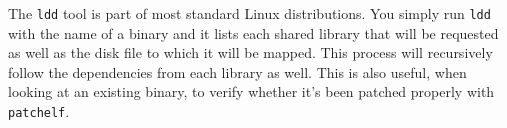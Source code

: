 The \texttt{ldd} tool is part of most standard Linux distributions. You
simply run \texttt{ldd} with the name of a binary and it lists each
shared library that will be requested as well as the disk file to
which it will be mapped. This process will recursively follow the
dependencies from each library as well. This is also useful, when
looking at an existing binary, to verify whether it's been patched
properly with \texttt{patchelf}.
